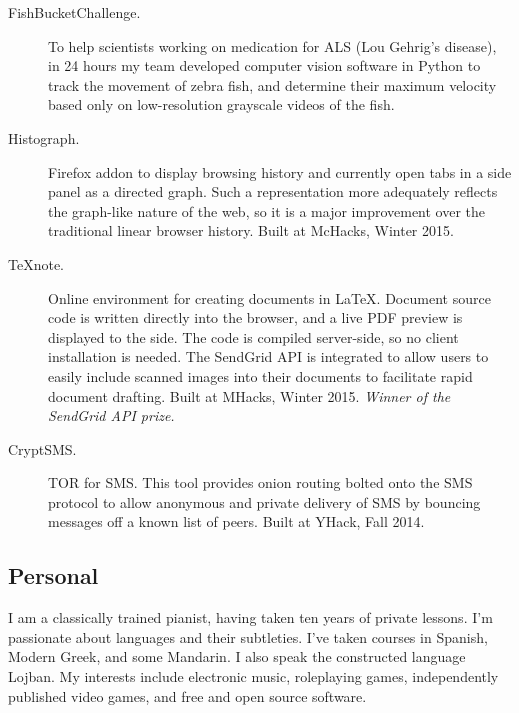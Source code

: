 \documentclass{article}
\begin{document}
\begin{description}
    \item[FishBucketChallenge.] To help scientists working on medication for
        ALS (Lou Gehrig's disease), in 24 hours my team developed computer
        vision software in Python to track the movement of zebra fish, and
        determine their maximum velocity based only on low-resolution grayscale
        videos of the fish.
    \item[Histograph.] Firefox addon to display browsing history and currently
        open tabs in a side panel as a directed graph. Such a representation
        more adequately reflects the graph-like nature of the web, so it is a
        major improvement over the traditional linear browser history. Built at
        McHacks, Winter 2015.
    \item[TeXnote.] Online environment for creating documents in \LaTeX.
        Document source code is written directly into the browser, and a live
        PDF preview is displayed to the side. The code is compiled server-side,
        so no client installation is needed. The SendGrid API is integrated to
        allow users to easily include scanned images into their documents to
        facilitate rapid document drafting. Built at MHacks, Winter 2015.
        \emph{Winner of the SendGrid API prize.}
    \item[CryptSMS.] TOR for SMS. This tool provides onion routing bolted onto
        the SMS protocol to allow anonymous and private delivery of SMS by
        bouncing messages off a known list of peers. Built at YHack, Fall 2014.
\end{description}

\subsection*{Personal}

I am a classically trained pianist, having taken ten years of private lessons.
I'm passionate about languages and their subtleties. I've taken courses in
Spanish, Modern Greek, and some Mandarin. I also speak the constructed language
Lojban.
My interests include electronic music, roleplaying games, independently
published video games, and free and open source software.
\end{document}
